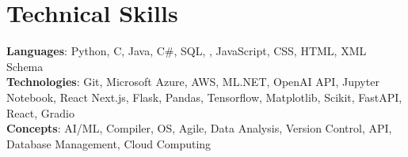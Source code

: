 \section{Technical Skills}
    \begin{itemize}[leftmargin=0.15in, label={}]
	\small{\item{
		\textbf{Languages}{: Python, C, Java, C\#, SQL, , JavaScript, CSS, HTML, XML Schema} \\
		\textbf{Technologies}{: Git, Microsoft Azure, AWS, ML.NET, OpenAI API, Jupyter Notebook, React Next.js, Flask, Pandas, Tensorflow, Matplotlib, Scikit, FastAPI, React, Gradio} \\
		\textbf{Concepts}{: AI/ML, Compiler, OS, Agile, Data Analysis, Version Control, API, Database Management, Cloud Computing}
	}}
    \end{itemize}